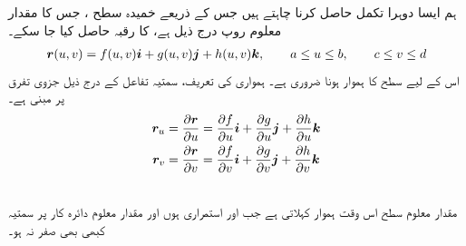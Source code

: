 ہم  ایسا  دوہرا تکمل حاصل کرنا  چاہتے ہیں جس کے ذریعے  خمیدہ سطح  ، جس کا مقدار معلوم روپ درج ذیل ہے، کا رقبہ  حاصل کیا  جا سکے۔
\begin{align*}
{\ensuremath{{\boldsymbol{r}}}}(u,v)=f(u,v){\boldsymbol{i}}+g(u,v){\boldsymbol{j}}+h(u,v){\boldsymbol{k}},\qquad a\le u\le b,\qquad c\le v\le d
\end{align*}
 اس  کے لیے سطح کا ہموار ہونا ضروری ہے۔ ہمواری کی تعریف،  سمتیہ  تفاعل  کے درج ذیل   جزوی تفرق   پر مبنی ہے۔
\begin{align*}
{\ensuremath{{\boldsymbol{r}}}}_u&=\frac{\partial {\ensuremath{{\boldsymbol{r}}}}}{\partial u}=\frac{\partial f}{\partial u}{\boldsymbol{i}}+\frac{\partial g}{\partial u}{\boldsymbol{j}}+\frac{\partial h}{\partial u}{\boldsymbol{k}}\\
{{\boldsymbol{r}}}_v&=
\frac{\partial {\ensuremath{{\boldsymbol{r}}}}}{\partial v}=\frac{\partial f}{\partial v}{\boldsymbol{i}}+\frac{\partial g}{\partial v}{\boldsymbol{j}}+\frac{\partial h}{\partial v}{\boldsymbol{k}} \end{align*}

\\
مقدار معلوم سطح  اس وقت ہموار کہلاتی ہے جب  اور   استمراری ہوں اور  مقدار معلوم دائرہ کار پر    سمتیہ      کبھی    بھی صفر نہ ہو۔

